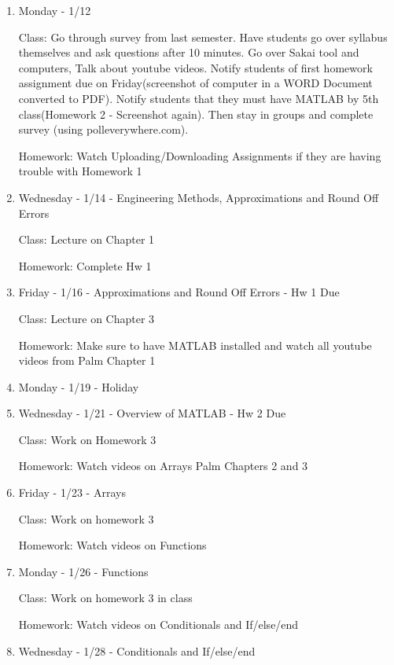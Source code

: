 \begin{enumerate}

\item Monday - 1/12 

  Class: Go through survey from last semester. Have
  students go over syllabus themselves and ask questions after 10
  minutes. Go over Sakai tool and computers, Talk about youtube
  videos. Notify students of first homework assignment due on
  Friday(screenshot of computer in a WORD Document converted to
  PDF). Notify students that they must have MATLAB by 5th
  class(Homework 2 - Screenshot again). Then stay in groups and
  complete survey (using polleverywhere.com).  
  
  Homework: Watch Uploading/Downloading Assignments if they are
  having trouble with Homework 1

\item Wednesday - 1/14 - Engineering Methods, Approximations and Round
  Off Errors

  Class: Lecture on Chapter 1

  Homework: Complete Hw 1

\item Friday - 1/16 - Approximations and Round Off Errors - Hw 1 Due

  Class: Lecture on Chapter 3

  Homework: Make sure to have MATLAB installed and watch all youtube
  videos from Palm Chapter 1

\item Monday - 1/19 - Holiday

\item Wednesday - 1/21 - Overview of MATLAB - Hw 2 Due

  Class: Work on Homework 3
  
  Homework: Watch videos on Arrays Palm Chapters 2 and 3

\item Friday - 1/23 - Arrays

  Class: Work on homework 3

  Homework: Watch videos on Functions 

\item Monday - 1/26 - Functions

  Class: Work on homework 3 in class

  Homework: Watch videos on Conditionals and If/else/end

\item Wednesday - 1/28 - Conditionals and If/else/end


\end{enumerate}
